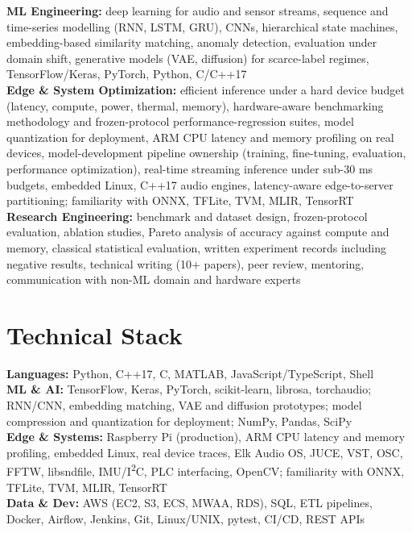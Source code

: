\documentclass[11pt]{article}
\begin{document}
\textbf{ML Engineering:} deep learning for audio and sensor streams, sequence and time-series modelling (RNN, LSTM, GRU), CNNs, hierarchical state machines, embedding-based similarity matching, anomaly detection, evaluation under domain shift, generative models (VAE, diffusion) for scarce-label regimes, TensorFlow/Keras, PyTorch, Python, C/C++17\\
\textbf{Edge \& System Optimization:} efficient inference under a hard device budget (latency, compute, power, thermal, memory), hardware-aware benchmarking methodology and frozen-protocol performance-regression suites, model quantization for deployment, ARM CPU latency and memory profiling on real devices, model-development pipeline ownership (training, fine-tuning, evaluation, performance optimization), real-time streaming inference under sub-30 ms budgets, embedded Linux, C++17 audio engines, latency-aware edge-to-server partitioning; familiarity with ONNX, TFLite, TVM, MLIR, TensorRT\\
\textbf{Research Engineering:} benchmark and dataset design, frozen-protocol evaluation, ablation studies, Pareto analysis of accuracy against compute and memory, classical statistical evaluation, written experiment records including negative results, technical writing (10+ papers), peer review, mentoring, communication with non-ML domain and hardware experts

\section*{Technical Stack}

\textbf{Languages:} Python, C++17, C, MATLAB, JavaScript/TypeScript, Shell\\
\textbf{ML \& AI:} TensorFlow, Keras, PyTorch, scikit-learn, librosa, torchaudio; RNN/CNN, embedding matching, VAE and diffusion prototypes; model compression and quantization for deployment; NumPy, Pandas, SciPy\\
\textbf{Edge \& Systems:} Raspberry Pi (production), ARM CPU latency and memory profiling, embedded Linux, real device traces, Elk Audio OS, JUCE, VST, OSC, FFTW, libsndfile, IMU/I\textsuperscript{2}C, PLC interfacing, OpenCV; familiarity with ONNX, TFLite, TVM, MLIR, TensorRT\\
\textbf{Data \& Dev:} AWS (EC2, S3, ECS, MWAA, RDS), SQL, ETL pipelines, Docker, Airflow, Jenkins, Git, Linux/UNIX, pytest, CI/CD, REST APIs

\end{document}
